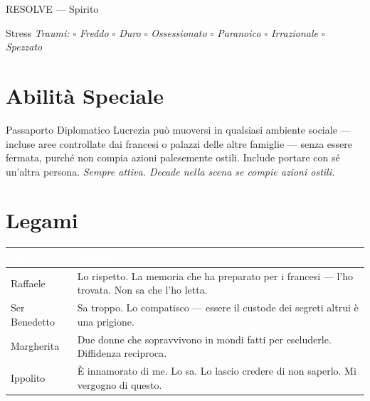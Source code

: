 \begin{attributoblock}[SpinolaRed]{RESOLVE — Spirito}


\end{attributoblock}

\medskip
\begin{pgclockbox}{Stress \hfill {}}
\small\textit{Traumi: $\square$ Freddo \quad $\square$ Duro \quad $\square$ Ossessionato \quad $\square$ Paranoico \quad $\square$ Irrazionale \quad $\square$ Spezzato}
\end{pgclockbox}

\section*{Abilità Speciale}
\begin{spinolabox}{Passaporto Diplomatico}
Lucrezia può muoversi in qualsiasi ambiente sociale — incluse aree controllate dai francesi o palazzi delle altre famiglie — senza essere fermata, purché non compia azioni palesemente ostili. Include portare con sé un'altra persona. \textit{Sempre attiva. Decade nella scena se compie azioni ostili.}
\end{spinolabox}

\section*{Legami}
\begin{table}[h]\centering\renewcommand{\arraystretch}{1.4}
\begin{tabularx}{\linewidth}{@{}L{2.6cm} X@{}}
\toprule{}
\textcolor{white}{\textbf{PG}} & \textcolor{white}{\textbf{Legame}} \\
\midrule
Raffaele & Lo rispetto. La memoria che ha preparato per i francesi — l'ho trovata. Non sa che l'ho letta. \\
Ser Benedetto & Sa troppo. Lo compatisco — essere il custode dei segreti altrui è una prigione. \\
Margherita & Due donne che sopravvivono in mondi fatti per escluderle. Diffidenza reciproca. \\
Ippolito & È innamorato di me. Lo sa. Lo lascio credere di non saperlo. Mi vergogno di questo. \\
\bottomrule
\end{tabularx}
\end{table}

